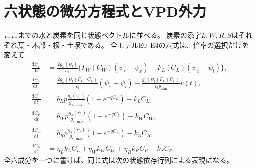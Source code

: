 \documentclass[a4paper,11pt]{ltjsarticle}
\newcommand{\dd}{\mathrm{d}}
\begin{document}
\section{六状態の微分方程式とVPD外力}\label{sec:fullode}
ここまでの水と炭素を同じ状態ベクトルに並べる。
炭素の添字$L,W,R,S$はそれぞれ葉・木部・根・土壌である。
全モデルE0--E4の六式は、倍率の選択だけを変えて
\begin{equation}\label{eq:sixscalar}
\boxed{\begin{aligned}
\frac{\dd\psi_x}{\dd t}
 &=\frac{2g_x(\psi_l)}{c_x}
     \{F_W(C_W)(\psi_r-\psi_x)-F_L(C_L)(\psi_x-\psi_l)\},\\
\frac{\dd\psi_l}{\dd t}
 &=\frac{2g_x(\psi_l)F_L(C_L)}{c_l}(\psi_x-\psi_l)
   -\frac{g_s(\psi_l)F_E(C_L)}{c_l p_{\mathrm{atm}}}v(t),\\
\frac{\dd C_L}{\dd t}
 &=b_Lp\frac{g_s(\psi_l)}{g_{s,\max}}(1-e^{-qC_L})-k_LC_L,\\
\frac{\dd C_W}{\dd t}
 &=b_Wp\frac{g_s(\psi_l)}{g_{s,\max}}(1-e^{-qC_L})-k_WC_W,\\
\frac{\dd C_R}{\dd t}
 &=b_Rp\frac{g_s(\psi_l)}{g_{s,\max}}(1-e^{-qC_L})-k_RC_R,\\
\frac{\dd C_S}{\dd t}
 &=\eta_Lk_LC_L+\eta_Wk_WC_W+\eta_Rk_RC_R-k_SC_S .
\end{aligned}}
\end{equation}
全六成分を一つに書けば、同じ式は次の状態依存行列による表現になる。
\end{document}
